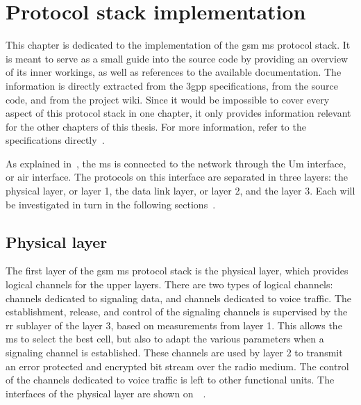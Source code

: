 \chapter{Protocol stack implementation}
\label{chap:protocol_stack_implementation}

This chapter is dedicated to the  implementation of the
\gls{gsm} \gls{ms} protocol stack. It is meant to serve as a small guide
into the source code by providing an overview of its inner workings, as
well as references to the available documentation. The information is
directly extracted from the \gls{3gpp} specifications, from the source
code, and from the project wiki. Since it would be impossible to cover
every aspect of this protocol stack in one chapter, it only provides
information relevant for the other chapters of this thesis. For more
information, refer to the specifications
directly~\cite{3gpp_specifications_????,osmocombb_ms-side_????,osmocombb_2015}.

As explained in~, the \gls{ms} is
connected to the network through the Um interface, or air interface. The
protocols on this interface are separated in three layers: the physical
layer, or layer 1, the data link layer, or layer 2, and the layer 3.
Each will be investigated in turn in the following
sections~\cite{3gpp_ts_2014-2}.

\section{Physical layer}

  The first layer of the \gls{gsm} \gls{ms} protocol stack is the
  physical layer, which provides logical channels for the upper layers.
  There are two types of logical channels: channels dedicated to
  signaling data, and channels dedicated to voice traffic. The
  establishment, release, and control of the signaling channels is
  supervised by the \gls{rr} sublayer of the layer 3, based on
  measurements from layer 1. This allows the \gls{ms} to select the best
  cell, but also to adapt the various parameters when a signaling
  channel is established. These channels are used by layer 2 to transmit
  an error protected and encrypted bit stream over the radio medium. The
  control of the channels dedicated to voice traffic is left to other
  functional units. The interfaces of the physical layer are shown
  on~~\cite{3gpp_ts_2014-4}.

